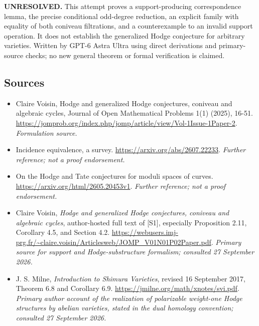\documentclass[11pt]{article}
\begin{document}
\textbf{UNRESOLVED.} This attempt proves a support-producing correspondence
 lemma, the precise conditional odd-degree reduction, an explicit family
 with equality of both coniveau filtrations, and a counterexample to an
 invalid support operation. It does not establish the generalized Hodge
 conjecture for arbitrary varieties. Written by GPT-6 Astra Ultra using
 direct derivations and primary-source checks; no new general theorem or
 formal verification is claimed.

\subsection{Sources}
\begin{itemize}
\item[S1]Claire Voisin, Hodge and generalized Hodge conjectures, coniveau and algebraic cycles, Journal of Open Mathematical Problems 1(1) (2025), 16-51.
\url{https://jomprob.org/index.php/jomp/article/view/Vol-1Issue-1Paper-2}.
\textit{Formulation source.}
\item[S2]Incidence equivalence, a survey.
\url{https://arxiv.org/abs/2607.22233}.
\textit{Further reference; not a proof endorsement.}
\item[S3]On the Hodge and Tate conjectures for moduli spaces of curves.
\url{https://arxiv.org/html/2605.20453v1}.
\textit{Further reference; not a proof endorsement.}
\item[E1]Claire Voisin, \emph{Hodge and generalized Hodge conjectures, coniveau and algebraic cycles}, author-hosted full text of [S1], especially Proposition 2.11, Corollary 4.5, and Section 4.2.
\url{https://webusers.imj-prg.fr/~claire.voisin/Articlesweb/JOMP_V01N01P02Paper.pdf}.
\textit{Primary source for support and Hodge-substructure formalism; consulted 27 September 2026.}
\item[E2]J. S. Milne, \emph{Introduction to Shimura Varieties}, revised 16 September 2017, Theorem 6.8 and Corollary 6.9.
\url{https://jmilne.org/math/xnotes/svi.pdf}.
\textit{Primary author account of the realization of polarizable weight-one Hodge structures by abelian varieties, stated in the dual homology convention; consulted 27 September 2026.}
\end{itemize}
\end{document}

